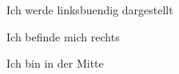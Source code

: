 \begin{flushleft}
	Ich werde linksbuendig dargestellt 
\end{flushleft}
\begin{flushright}
	Ich befinde mich rechts
\end{flushright}
\begin{center}
	Ich bin in der Mitte	 
\end{center}